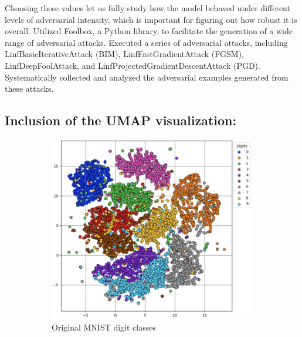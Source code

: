 \documentclass[10pt, conference, a4paper, final]{IEEEtran}
\begin{document}
Choosing these values let us fully study how the model behaved under different levels of adversarial intensity, which is important for 
figuring out how robust it is overall. Utilized Foolbox, a Python library, to facilitate the generation of a wide range of adversarial attacks.
Executed a series of adversarial attacks, including LinfBasicIterativeAttack (BIM), LinfFastGradientAttack (FGSM), LinfDeepFoolAttack, 
and LinfProjectedGradientDescentAttack (PGD). Systematically collected and analyzed the adversarial examples generated from these attacks.


\subsection{Inclusion of the UMAP visualization:}

\begin{figure}[!ht]
    \centering
    \begin{subfigure}{.31\textwidth}
        \centering
        \includegraphics[width=\linewidth]{paper_images/UMAP_mnist.png}
        \caption{Original MNIST digit classes}
        \label{fig:umap_original}
    \end{subfigure}%
    \hfill
    \begin{subfigure}{.34\textwidth}
        \centering

\end{subfigure}
\end{figure}
\end{document}

